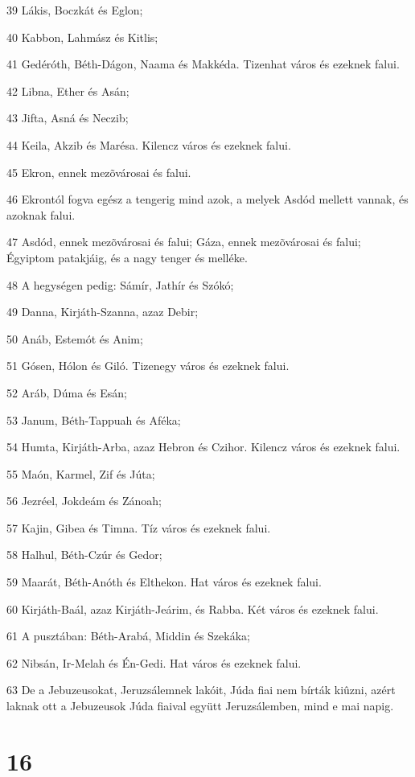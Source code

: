 \par 39 Lákis, Boczkát és Eglon;
\par 40 Kabbon, Lahmász és Kitlis;
\par 41 Gedéróth, Béth-Dágon, Naama és Makkéda. Tizenhat város és ezeknek falui.
\par 42 Libna, Ether és Asán;
\par 43 Jifta, Asná és Neczib;
\par 44 Keila, Akzib és Marésa. Kilencz város és ezeknek falui.
\par 45 Ekron, ennek mezõvárosai és falui.
\par 46 Ekrontól fogva egész a tengerig mind azok, a melyek Asdód mellett vannak, és azoknak falui.
\par 47 Asdód, ennek mezõvárosai és falui; Gáza, ennek mezõvárosai és falui; Égyiptom patakjáig, és a nagy tenger és melléke.
\par 48 A hegységen pedig: Sámír, Jathír és Szókó;
\par 49 Danna, Kirjáth-Szanna, azaz Debir;
\par 50 Anáb, Estemót és Anim;
\par 51 Gósen, Hólon és Giló. Tizenegy város és ezeknek falui.
\par 52 Aráb, Dúma és Esán;
\par 53 Janum, Béth-Tappuah és Aféka;
\par 54 Humta, Kirjáth-Arba, azaz Hebron és Czihor. Kilencz város és ezeknek falui.
\par 55 Maón, Karmel, Zif és Júta;
\par 56 Jezréel, Jokdeám és Zánoah;
\par 57 Kajin, Gibea és Timna. Tíz város és ezeknek falui.
\par 58 Halhul, Béth-Czúr és Gedor;
\par 59 Maarát, Béth-Anóth és Elthekon. Hat város és ezeknek falui.
\par 60 Kirjáth-Baál, azaz Kirjáth-Jeárim, és Rabba. Két város és ezeknek falui.
\par 61 A pusztában: Béth-Arabá, Middin és Szekáka;
\par 62 Nibsán, Ir-Melah és Én-Gedi. Hat város és ezeknek falui.
\par 63 De a Jebuzeusokat, Jeruzsálemnek lakóit, Júda fiai nem bírták kiûzni, azért laknak ott a Jebuzeusok Júda fiaival együtt Jeruzsálemben, mind e mai napig.

\chapter{16}

